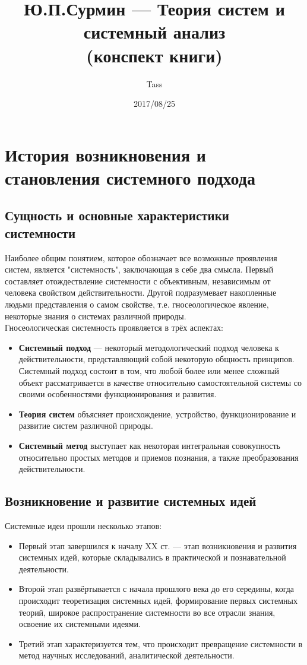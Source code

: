 \documentclass{article}
\newcommand{\important}[1]{\textbf{#1}}
\begin{document}
\title{Ю.П.Сурмин --- Теория систем и системный анализ\\(конспект книги)}
\author{Tass}
\date{2017/08/25}
\maketitle

\tableofcontents
\newpage

\section{История возникновения и становления системного подхода}
\subsection{Сущность и основные характеристики системности}
Наиболее общим понятием, которое обозначает все возможные проявления систем, является "системность", заключающая в себе два смысла. Первый составляет отождествление системности с объективным, независимым от человека свойством действительности. Другой подразумевает накопленные людьми представления о самом свойстве, т.е. гносеологическое явление, некоторые знания о системах различной природы.
\\
Гносеологическая системность проявляется в трёх аспектах:
\begin{itemize}
\item \important{Системный подход} --- некоторый методологический подход человека к действительности, представляющий собой некоторую общность принципов. Системный подход состоит в том, что любой более или менее сложный объект рассматривается в качестве относительно самостоятельной системы со своими особенностями функционирования и развития.
\item \important{Теория систем} объясняет происхождение, устройство, функционирование и развитие систем различной природы.
\item \important{Системный метод} выступает как некоторая интегральная совокупность относительно простых методов и приемов познания, а также преобразования действительности.
\end{itemize}
\subsection{Возникновение и развитие системных идей}
Системные идеи прошли несколько этапов:
\begin{itemize}
\item Первый этап завершился к началу XX ст. --- этап возникновения и развития системных идей, которые складывались в практической и познавательной деятельности.
\item Второй этап развёртывается с начала прошлого века до его середины, когда происходит теоретизация системных идей, формирование первых системных теорий, широкое распространение системности во все отрасли знания, освоение их системными идеями.
\item Третий этап характеризуется тем, что происходит превращение системности в метод научных исследований, аналитической деятельности.
\end{itemize}
\end{document}
